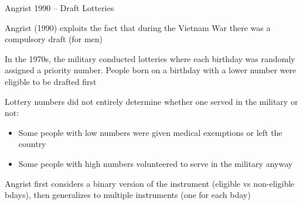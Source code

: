 \documentclass[11pt,english,handout]{beamer}
\newenvironment{wideitemize}{\itemize\addtolength{\itemsep}{10pt}}{\enditemize}
\begin{document}
\begin{frame}{Angrist 1990 -- Draft Lotteries}
	\begin{wideitemize}
		\item
		Angrist (1990) exploits the fact that during the Vietnam War there was a compulsory draft (for men)
		
		\item
		In the 1970s, the military conducted lotteries where each birthday was randomly assigned a priority number. People born on a birthday with a lower number were eligible to be drafted first
		
		\pause
		\item
		Lottery numbers did not entirely determine whether one served in the military or not:
		
			\begin{itemize}
				\item 
				Some people with low numbers were given medical exemptions or left the country
				
				\item
				Some people with high numbers volunteered to serve in the military anyway
			\end{itemize} 
		
		\pause
		\item
		Angrist first considers a binary version of the instrument (eligible vs non-eligible bdays), then generalizes to multiple instruments (one for each bday)
	\end{wideitemize}
\end{frame}
\end{document}
